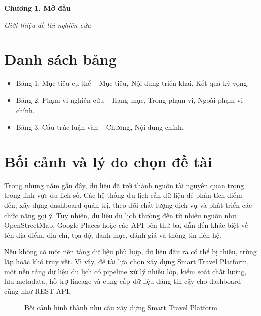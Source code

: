 \documentclass[12pt,a4paper]{article}
\begin{document}
\begin{center}
{\Large\bfseries Chương 1. Mở đầu}

\vspace{0.3em}
{\large\itshape Giới thiệu đề tài nghiên cứu}
\end{center}

\section*{Danh sách bảng}

\begin{itemize}
  \item Bảng 1. Mục tiêu cụ thể -- Mục tiêu, Nội dung triển khai, Kết quả kỳ vọng.
  \item Bảng 2. Phạm vi nghiên cứu -- Hạng mục, Trong phạm vi, Ngoài phạm vi chính.
  \item Bảng 3. Cấu trúc luận văn -- Chương, Nội dung chính.
\end{itemize}


\setcounter{section}{0}

\section{Bối cảnh và lý do chọn đề tài}

Trong những năm gần đây, dữ liệu đã trở thành nguồn tài nguyên quan trọng trong lĩnh vực du lịch số. Các hệ thống du lịch cần dữ liệu để phân tích điểm đến, xây dựng dashboard quản trị, theo dõi chất lượng dịch vụ và phát triển các chức năng gợi ý. Tuy nhiên, dữ liệu du lịch thường đến từ nhiều nguồn như OpenStreetMap, Google Places hoặc các API bên thứ ba, dẫn đến khác biệt về tên địa điểm, địa chỉ, tọa độ, danh mục, đánh giá và thông tin liên hệ.

Nếu không có một nền tảng dữ liệu phù hợp, dữ liệu đầu ra có thể bị thiếu, trùng lặp hoặc khó truy vết. Vì vậy, đề tài lựa chọn xây dựng Smart Travel Platform, một nền tảng dữ liệu du lịch có pipeline xử lý nhiều lớp, kiểm soát chất lượng, lưu metadata, hỗ trợ lineage và cung cấp dữ liệu đáng tin cậy cho dashboard cũng như REST API.

\begin{figure}[htbp]
\centering
{}
\caption{Bối cảnh hình thành nhu cầu xây dựng Smart Travel Platform.}
\end{figure}
\end{document}
